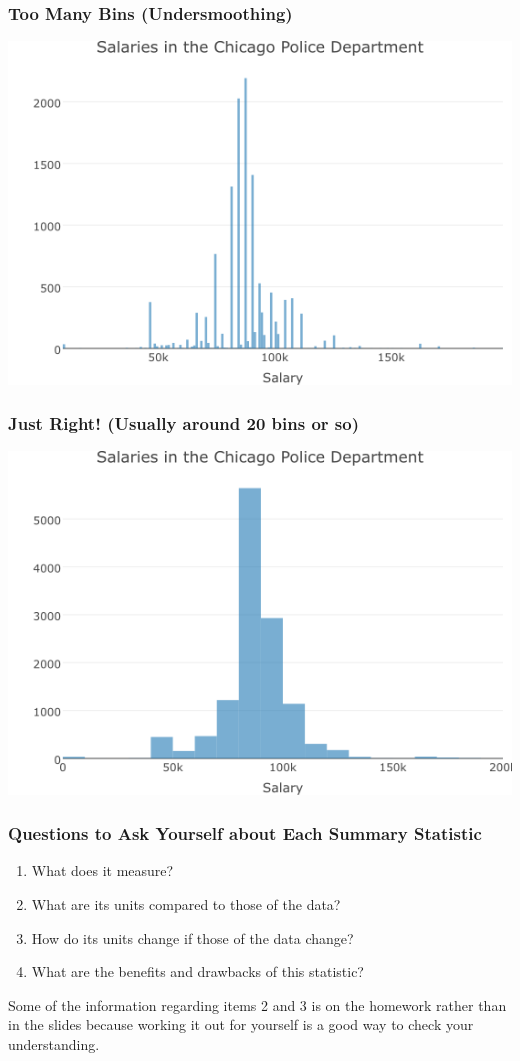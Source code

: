 \documentclass[handout]{beamer}
\begin{document}
\begin{frame}
\frametitle{Too Many Bins (Undersmoothing)}
	\includegraphics[width = \textwidth]{./images/histogramMany.png}
\end{frame}

\begin{frame}
\frametitle{Just Right! (Usually around 20 bins or so)}
	\includegraphics[width = \textwidth]{./images/histogramRight.png}
\end{frame}

\begin{frame}
\frametitle{Questions to Ask Yourself about Each Summary Statistic}
	\begin{enumerate}
		\item What does it measure?
		\item What are its units compared to those of the data?
		\item How do its units change if those of the data change?
		\item What are the benefits and drawbacks of this statistic?
	\end{enumerate}
	\vspace{2em}
	\alert{Some of the information regarding items 2 and 3 is on the homework rather than in the 		slides because working it out for yourself is a good way to check your understanding.}
\end{frame}
\end{document}
